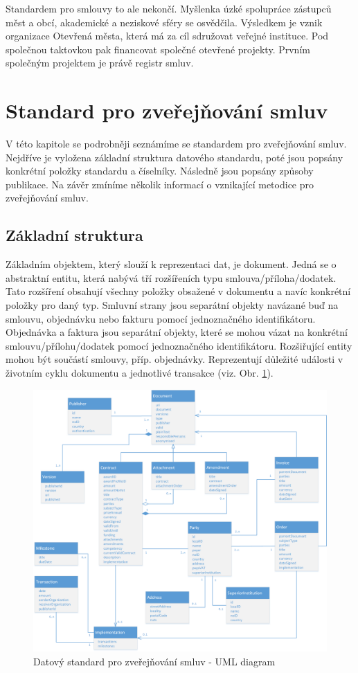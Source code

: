 Standardem pro smlouvy to ale nekončí. Myšlenka úzké spolupráce zástupců měst a obcí, akademické a neziskové sféry se osvědčila. Výsledkem je vznik organizace Otevřená města\cite{otv}, která má za cíl sdružovat veřejné instituce. Pod společnou taktovkou pak financovat společné otevřené projekty. Prvním společným projektem je právě registr smluv.

\section{Standard pro zveřejňování smluv}

V této kapitole se podrobněji seznámíme se standardem pro zveřejňování smluv. Nejdříve je vyložena základní struktura datového standardu, poté jsou popsány konkrétní položky standardu a číselníky. Následně jsou popsány způsoby publikace. Na závěr zmíníme několik informací o vznikající metodice pro zveřejňování smluv. 

\subsection{Základní struktura}

Základním objektem, který slouží k reprezentaci dat, je dokument. Jedná se o abstraktní entitu, která nabývá tří rozšířeních typu smlouva/příloha/dodatek. Tato rozšíření obsahují všechny položky obsažené v dokumentu a navíc konkrétní položky pro daný typ.
Smluvní strany jsou separátní objekty navázané buď na smlouvu, objednávku nebo fakturu pomocí jednoznačného identifikátoru.
Objednávka a faktura jsou separátní objekty, které se mohou vázat na konkrétní smlouvu/přílohu/dodatek pomocí jednoznačného identifikátoru.
Rozšiřující entity mohou být součástí smlouvy, příp. objednávky. Reprezentují důležité události v životním cyklu dokumentu a jednotlivé transakce (viz. Obr. \ref{obr:standardDatamodel}). 

\begin{figure}[H]
\centerline{\includegraphics[width=\textwidth]{img/standardDatamodel.eps}}
\caption{Datový standard pro zveřejňování smluv - UML diagram}
\label{obr:standardDatamodel}
\end{figure}

